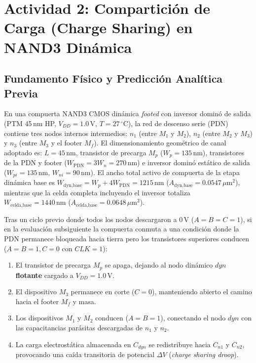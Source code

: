 \section{Actividad 2: Compartición de Carga (Charge Sharing) en NAND3 Dinámica}
\label{sec:actividad2}

\subsection{Fundamento Físico y Predicción Analítica Previa}
En una compuerta NAND3 CMOS dinámica \textit{footed} con inversor dominó de salida (PTM 45\,nm HP, $V_{DD} = 1.0\,\text{V}$, $T = 27\,^\circ\text{C}$), la red de descenso serie (PDN) contiene tres nodos internos intermedios: $n_1$ (entre $M_1$ y $M_2$), $n_2$ (entre $M_2$ y $M_3$) y $n_3$ (entre $M_3$ y el footer $M_f$). El dimensionamiento geométrico de canal adoptado es: $L = 45\,\text{nm}$, transistor de precarga $M_p$ ($W_p = 135\,\text{nm}$), transistores de la PDN y footer ($W_{\text{PDN}} = 3W_n = 270\,\text{nm}$) e inversor dominó estático de salida ($W_{pi} = 135\,\text{nm}$, $W_{ni} = 90\,\text{nm}$). El ancho total activo de compuerta de la etapa dinámica base es $W_{\text{dyn,base}} = W_p + 4 W_{\text{PDN}} = 1215\,\text{nm}$ ($A_{\text{dyn,base}} = 0.0547\,\mu\text{m}^2$), mientras que la celda completa incluyendo el inversor totaliza $W_{\text{celda,base}} = 1440\,\text{nm}$ ($A_{\text{celda,base}} = 0.0648\,\mu\text{m}^2$).

Tras un ciclo previo donde todos los nodos descargaron a $0\,\text{V}$ ($A=B=C=1$), si en la evaluación subsiguiente la compuerta conmuta a una condición donde la PDN permanece bloqueada hacia tierra pero los transistores superiores conducen ($A=B=1, C=0$ con $CLK=1$):
\begin{enumerate}[leftmargin=1.4em,itemsep=0.12em]
  \item El transistor de precarga $M_p$ se apaga, dejando al nodo dinámico $dyn$ \textbf{flotante} cargado a $V_{DD} = 1.0\,\text{V}$.
  \item El dispositivo $M_3$ permanece en corte ($C=0$), manteniendo abierto el camino hacia el footer $M_f$ y masa.
  \item Los dispositivos $M_1$ y $M_2$ conducen ($A=B=1$), conectando el nodo $dyn$ con las capacitancias parásitas descargadas de $n_1$ y $n_2$.
  \item La carga electrostática almacenada en $C_{dyn}$ se redistribuye hacia $C_{n1}$ y $C_{n2}$, provocando una caída transitoria de potencial $\Delta V$ (\textit{charge sharing droop}).
\end{enumerate}

